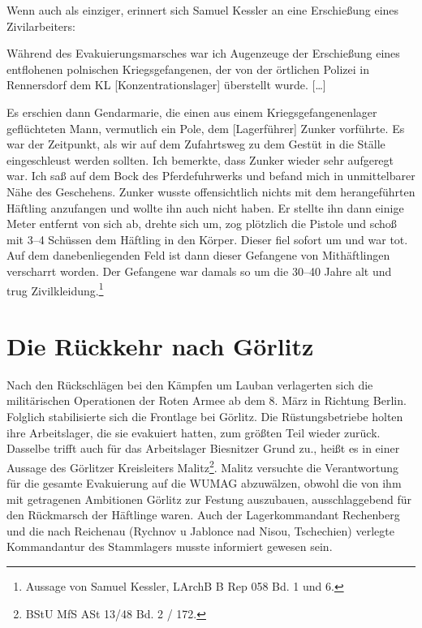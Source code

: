 \documentclass[a4paper,12pt,ngerman,
]{nisebook}
\begin{document}
Wenn auch als einziger, erinnert sich Samuel Kessler an eine Erschießung eines Zivilarbeiters:
\begin{leftbar} 
Während des Evakuierungsmarsches war ich Augenzeuge der Erschießung eines entflohenen polnischen Kriegsgefangenen, der von der örtlichen Polizei in Rennersdorf dem KL [Konzentrationslager] überstellt wurde. [\dots]

Es erschien dann Gendarmarie, die einen aus einem Kriegsgefangenenlager geflüchteten Mann, vermutlich ein Pole, dem [Lagerführer] Zunker vorführte. Es war der Zeitpunkt, als wir auf dem Zufahrtsweg zu dem Gestüt in die Ställe eingeschleust werden sollten. Ich bemerkte, dass Zunker wieder sehr aufgeregt war. Ich saß auf dem Bock des Pferdefuhrwerks und befand mich in unmittelbarer Nähe des Geschehens. Zunker wusste offensichtlich nichts mit dem herangeführten Häftling anzufangen und wollte ihn auch nicht haben. Er stellte ihn dann einige Meter entfernt von sich ab, drehte sich um, zog plötzlich die Pistole und schoß mit 3--4 Schüssen dem Häftling in den Körper. Dieser fiel sofort um und war tot. Auf dem danebenliegenden Feld ist dann dieser Gefangene von Mithäftlingen verscharrt worden. Der Gefangene war damals so um die 30--40 Jahre alt und trug Zivilkleidung.\footnote{Aussage von Samuel Kessler, LArchB B Rep 058 Bd. 1 und 6.}
\end{leftbar}
 








\section{Die Rückkehr nach Görlitz}
Nach den Rückschlägen bei den Kämpfen um Lauban verlagerten sich die militärischen Operationen der Roten Armee ab dem 8. März in Richtung Berlin. Folglich stabilisierte sich die Frontlage bei Görlitz. \glqq Die Rüstungsbetriebe holten ihre Arbeitslager, die sie evakuiert hatten, zum größten Teil wieder zurück. Dasselbe trifft auch für das Arbeitslager Biesnitzer Grund zu.\grqq, heißt es in einer Aussage des Görlitzer Kreisleiters Malitz\footnote{BStU MfS ASt 13/48 Bd. 2 / 172.}. 
Malitz versuchte die Verantwortung für die gesamte Evakuierung auf die WUMAG abzuwälzen, obwohl die von ihm mit getragenen Ambitionen Görlitz zur Festung auszubauen, ausschlaggebend für den Rückmarsch der Häftlinge waren. Auch der Lagerkommandant Rechenberg und die nach Reichenau (Rychnov u Jablonce nad Nisou, Tschechien) verlegte Kommandantur des Stammlagers musste informiert gewesen sein. 
\end{document}

